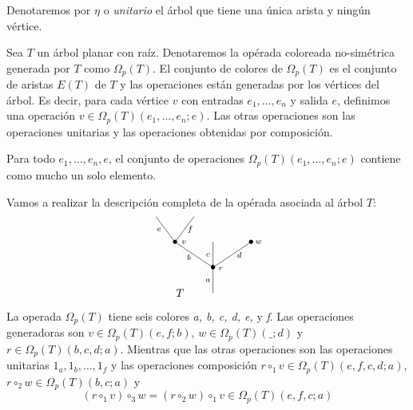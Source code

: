 \documentclass[../main.tex]{subfiles}
\begin{document}
\begin{defi}
    Denotaremos por $\eta$ o \emph{unitario} el \'arbol que tiene una \'unica arista y ning\'un v\'ertice.
\end{defi}
\begin{defi}
    Sea $T$ un \'arbol planar con ra\'iz. Denotaremos la op\'erada coloreada no-sim\'etrica generada por $T$ como $\Omega_p(T)$. El conjunto de colores de $\Omega_p(T)$ es el conjunto de aristas $E(T)$ de $T$ y las operaciones est\'an generadas por los v\'ertices del \'arbol.
    Es decir, para cada v\'ertice $v$ con entradas $e_1,\dots,e_n$ y salida $e$, definimos una operaci\'on $v\in \Omega_p(T)(e_1,\dots,e_n;e)$. Las otras operaciones son las operaciones unitarias y las operaciones obtenidas por composici\'on.
\end{defi}
\begin{obs}
    Para todo $e_1,\dots,e_n,e$, el conjunto de operaciones $\Omega_p(T)(e_1,\dots,e_n;e)$ contiene como mucho un solo elemento.
\end{obs}
\begin{ex}
    Vamos a realizar la descripci\'on completa de la op\'erada asociada al \'arbol $T$:
    \begin{equation}
        \xy
        <0.08cm, 0cm>:
        (0.0, 0.0)*{}="1"; %
        (0.0, 10.0)*=0{\bullet}="2"; %
        (-15.0, 20.0)*=0{\bullet}="3"; %
        (-22.5, 30.0)*{}="4"; %
        (-7.5, 30.0)*{}="5"; %
        (0.0, 20.0)*{}="6"; %
        (15.0, 20.0)*=0{\bullet}="7"; %
        "1";"2" **\dir{-};
        "2";"3" **\dir{-};
        "3";"4" **\dir{-};
        "3";"5" **\dir{-};
        "2";"6" **\dir{-};
        "2";"7" **\dir{-};
        (3.0, 9.5)*=0{\scriptstyle r};
        (-11.5, 20.0)*=0{\scriptstyle v};
        (-2.0, 5.0)*=0{\scriptstyle a};
        (-9.5, 14.0)*=0{\scriptstyle b};
        (-21.3, 25.0)*=0{\scriptstyle e};
        (-9, 25.0)*=0{\scriptstyle f};
        (-2.0, 15.0)*=0{\scriptstyle c};
        (10.4, 15.0)*=0{\scriptstyle d};
        (18.0, 20.0)*=0{\scriptstyle w};
        (-13,0)*{T};
        \endxy
    \end{equation}

    La operada $\Omega_p(T)$ tiene seis colores \textit{a, b, c, d, e,} y \textit{f}. Las operaciones generadoras son $v\in \Omega_p(T)(e,f;b)$, $w\in \Omega_p(T)(\_;d)$ y $r\in \Omega_p(T)(b,c,d;a)$.
    Mientras que las otras operaciones son las operaciones unitarias $1_a,1_b,\dots,1_f$ y las operaciones composici\'on $r\circ_1v\in \Omega_p(T)(e,f,c,d;a)$, $r\circ_2w\in \Omega_p(T)(b,c;a)$ y
    $$(r\circ_1 v)\circ_3 w = (r\circ_2 w)\circ_1 v  \in \Omega_p(T)(e,f,c;a)$$
\end{ex}
\end{document}
